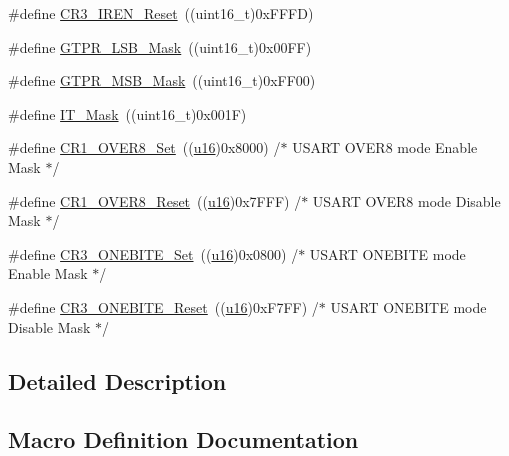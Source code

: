\begin{DoxyCompactItemize}
\item 
\#define \mbox{\hyperlink{group___u_s_a_r_t___private___defines_gad1520358de97e48fe18780e5cc5296bd}{C\+R3\+\_\+\+I\+R\+E\+N\+\_\+\+Reset}}~((uint16\+\_\+t)0x\+F\+F\+F\+D)
\item 
\#define \mbox{\hyperlink{group___u_s_a_r_t___private___defines_ga2fe593d0c308e2245bb66905930b3ebb}{G\+T\+P\+R\+\_\+\+L\+S\+B\+\_\+\+Mask}}~((uint16\+\_\+t)0x00\+F\+F)
\item 
\#define \mbox{\hyperlink{group___u_s_a_r_t___private___defines_ga405b4222892bafdf1d084de5efd24d70}{G\+T\+P\+R\+\_\+\+M\+S\+B\+\_\+\+Mask}}~((uint16\+\_\+t)0x\+F\+F00)
\item 
\#define \mbox{\hyperlink{group___u_s_a_r_t___private___defines_ga401c753d4de6ab56fcb026c91b8c8487}{I\+T\+\_\+\+Mask}}~((uint16\+\_\+t)0x001\+F)
\item 
\#define \mbox{\hyperlink{group___u_s_a_r_t___private___defines_ga11495857ca81074790c376317382140f}{C\+R1\+\_\+\+O\+V\+E\+R8\+\_\+\+Set}}~((\mbox{\hyperlink{group___exported__types_gace9d960e74685e2cd84b36132dbbf8aa}{u16}})0x8000)  /$\ast$ U\+S\+A\+R\+T O\+V\+E\+R8 mode Enable Mask $\ast$/
\item 
\#define \mbox{\hyperlink{group___u_s_a_r_t___private___defines_gaf84165f2974000906c495b3c27dc5121}{C\+R1\+\_\+\+O\+V\+E\+R8\+\_\+\+Reset}}~((\mbox{\hyperlink{group___exported__types_gace9d960e74685e2cd84b36132dbbf8aa}{u16}})0x7\+F\+F\+F)  /$\ast$ U\+S\+A\+R\+T O\+V\+E\+R8 mode Disable Mask $\ast$/
\item 
\#define \mbox{\hyperlink{group___u_s_a_r_t___private___defines_gac512024dda541435acfe0b50de925105}{C\+R3\+\_\+\+O\+N\+E\+B\+I\+T\+E\+\_\+\+Set}}~((\mbox{\hyperlink{group___exported__types_gace9d960e74685e2cd84b36132dbbf8aa}{u16}})0x0800)  /$\ast$ U\+S\+A\+R\+T O\+N\+E\+B\+I\+T\+E mode Enable Mask $\ast$/
\item 
\#define \mbox{\hyperlink{group___u_s_a_r_t___private___defines_ga55dc289819dde550630df98267bbef52}{C\+R3\+\_\+\+O\+N\+E\+B\+I\+T\+E\+\_\+\+Reset}}~((\mbox{\hyperlink{group___exported__types_gace9d960e74685e2cd84b36132dbbf8aa}{u16}})0x\+F7\+F\+F)  /$\ast$ U\+S\+A\+R\+T O\+N\+E\+B\+I\+T\+E mode Disable Mask $\ast$/
\end{DoxyCompactItemize}


\subsection{Detailed Description}


\subsection{Macro Definition Documentation}
\mbox{\label{group___u_s_a_r_t___private___defines_ga67f7dd35ea3d1296677e5fc50b88fa90}} 
